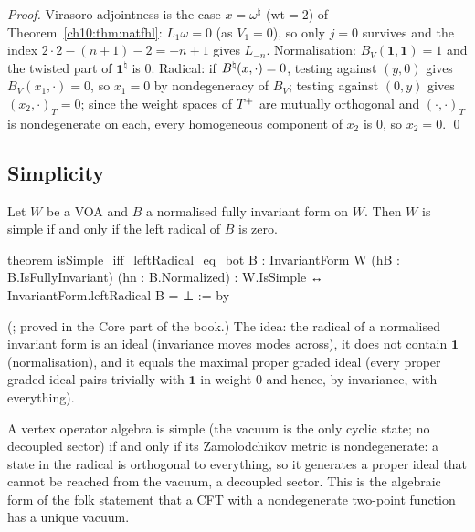 \emph{Proof.}  Virasoro adjointness is the case $x=\omega^\natural$ ($\mathrm{wt}=2$) of
Theorem~\ref{ch10:thm:natfhl}: $L_1\omega=0$ (as $V_1=0$), so only $j=0$ survives and the index
$2\cdot2-(n+1)-2=-n+1$ gives $L_{-n}$.  Normalisation: $B_V(\mathbf1,\mathbf1)=1$ and the twisted part
of $\mathbf1^\natural$ is $0$.  Radical: if $B^{\natural}(x,\cdot)=0$, testing against $(y,0)$ gives
$B_V(x_1,\cdot)=0$, so $x_1=0$ by nondegeneracy of $B_V$; testing against $(0,y)$ gives
$(x_2,\cdot)_T=0$; since the weight spaces of $T^{+}$ are mutually orthogonal and
$(\cdot,\cdot)_T$ is nondegenerate on each, every homogeneous component of $x_2$ is $0$, so
$x_2=0$. \qed

\subsection{Simplicity}

\begin{theorem}[Li]\label{ch10:thm:li}
Let $W$ be a VOA and $B$ a normalised fully invariant form on $W$.  Then $W$ is simple if and only
if the left radical of $B$ is zero.
\end{theorem}
\begin{leancode}
theorem isSimple_iff_leftRadical_eq_bot {B : InvariantForm W} (hB : B.IsFullyInvariant)
    (hn : B.Normalized) :
    W.IsSimple ↔ InvariantForm.leftRadical B = ⊥ := by
\end{leancode}
(; proved in the Core part of the book.)  The idea:
the radical of a normalised invariant form is an ideal (invariance moves modes across), it does
not contain $\mathbf1$ (normalisation), and it equals the maximal proper graded ideal (every proper
graded ideal pairs trivially with $\mathbf 1$ in weight $0$ and hence, by invariance, with
everything).

\begin{physics}
A vertex operator algebra is simple (the vacuum is the only cyclic state; no decoupled sector) if and only if its Zamolodchikov metric is nondegenerate: a state in the radical is orthogonal to everything, so it generates a proper ideal that cannot be reached from the vacuum, a decoupled sector. This is the algebraic form of the folk statement that a CFT with a nondegenerate two-point function has a unique vacuum.
\end{physics}

